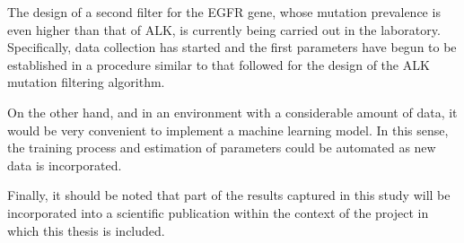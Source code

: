 The design of a second filter for the EGFR gene, whose mutation prevalence is even higher than that of ALK, is currently being carried out in the laboratory. Specifically, data collection has started and the first parameters have begun to be established in a procedure similar to that followed for the design of the ALK mutation filtering algorithm.

On the other hand, and in an environment with a considerable amount of data, it would be very convenient to implement a machine learning model. In this sense, the training process and estimation of parameters could be automated as new data is incorporated.

Finally, it should be noted that part of the results captured in this study will be incorporated into a scientific publication within the context of the project in which this thesis is included.